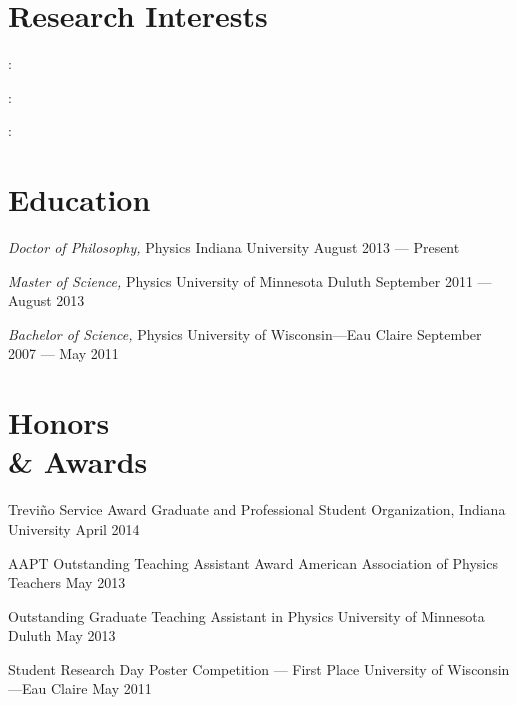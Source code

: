 \documentclass{cv}
\begin{document}
\begin{resume}



\section{Research Interests}

 : 
\itemSep

 : 
\itemSep

 : 



\section{Education}



\object
{\emph{Doctor of Philosophy,} Physics}
{Indiana University}
{August 2013 --- Present}


\object
{\emph{Master of Science,} Physics}
{University of Minnesota Duluth}
{September 2011 --- August 2013}


\object
{\emph{Bachelor of Science,} Physics}
{University of Wisconsin---Eau Claire}
{September 2007 --- May 2011}



\section{Honors \\ \& Awards}

\object
{Trevi\~{n}o Service Award}
{Graduate and Professional Student Organization, Indiana University}
{April 2014}

\object
{AAPT Outstanding Teaching Assistant Award}
{American Association of Physics Teachers}
{May 2013}


\object
{Outstanding Graduate Teaching Assistant in Physics}
{University of Minnesota Duluth}
{May 2013}


\object
{Student Research Day Poster Competition --- First Place}
{University of Wisconsin---Eau Claire}
{May 2011}



\end{resume}
\end{document}
